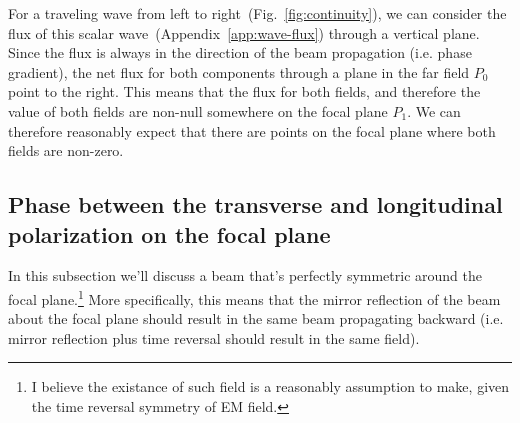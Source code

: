 \documentclass[10pt,fleqn]{article}
\begin{document}
For a traveling wave from left to right~(Fig.~\ref{fig:continuity}),
we can consider the flux of this scalar wave~(Appendix~\ref{app:wave-flux})
through a vertical plane. Since the flux is always in the direction
of the beam propagation (i.e. phase gradient), the net flux for both components
through a plane in the far field $P_0$ point to the right.
This means that the flux for both fields, and therefore the value of both fields
are non-null somewhere on the focal plane $P_1$.
We can therefore reasonably expect that there are points on the focal plane
where both fields are non-zero.\\

\subsection{Phase between the transverse and longitudinal polarization on the focal plane}
\label{sec:semi:axial-phase}
In this subsection we'll discuss a beam that's perfectly symmetric around
the focal plane.\footnote{I believe the existance of such field
  is a reasonably assumption to make, given the time reversal symmetry of EM field.}
More specifically, this means that the mirror reflection of the beam about
the focal plane should result in the same beam propagating backward
(i.e. mirror reflection plus time reversal should result in the same field).\\
\end{document}
